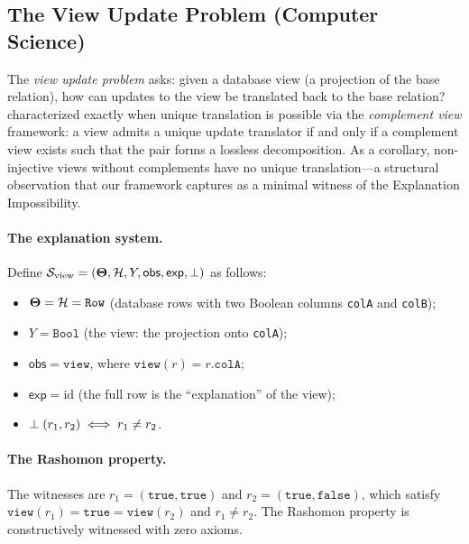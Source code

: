 \subsection{The View Update Problem (Computer Science)}
\label{sec:instance-view-update}

The \emph{view update problem} asks: given a database view (a projection of
the base relation), how can updates to the view be translated back to the
base relation?  \citet{bancilhon1981update} characterized exactly when unique
translation is possible via the \emph{complement view} framework: a view
admits a unique update translator if and only if a complement view exists such
that the pair forms a lossless decomposition.  As a corollary, non-injective
views without complements have no unique translation---a structural observation
that our framework captures as a minimal witness of the Explanation
Impossibility.

\paragraph{The explanation system.}
Define $\mathcal{S}_{\mathrm{view}} = (\mathbf{\Theta}, \mathcal{H}, Y, \mathsf{obs},
\mathsf{exp}, \perp)$ as follows:
\begin{itemize}
  \item $\mathbf{\Theta} = \mathcal{H} = \texttt{Row}$ (database rows with two Boolean columns
    \texttt{colA} and \texttt{colB});
  \item $Y = \texttt{Bool}$ (the view: the projection onto \texttt{colA});
  \item $\mathsf{obs} = \texttt{view}$, where $\texttt{view}(r) = r.\texttt{colA}$;
  \item $\mathsf{exp} = \mathrm{id}$ (the full row is the ``explanation'' of
    the view);
  \item $\perp(r_1, r_2) \iff r_1 \ne r_2$.
\end{itemize}

\paragraph{The Rashomon property.}
The witnesses are $r_1 = (\mathtt{true}, \mathtt{true})$ and
$r_2 = (\mathtt{true}, \mathtt{false})$, which satisfy
$\texttt{view}(r_1) = \mathtt{true} = \texttt{view}(r_2)$ and
$r_1 \ne r_2$.  The Rashomon property is constructively witnessed with
zero axioms.


